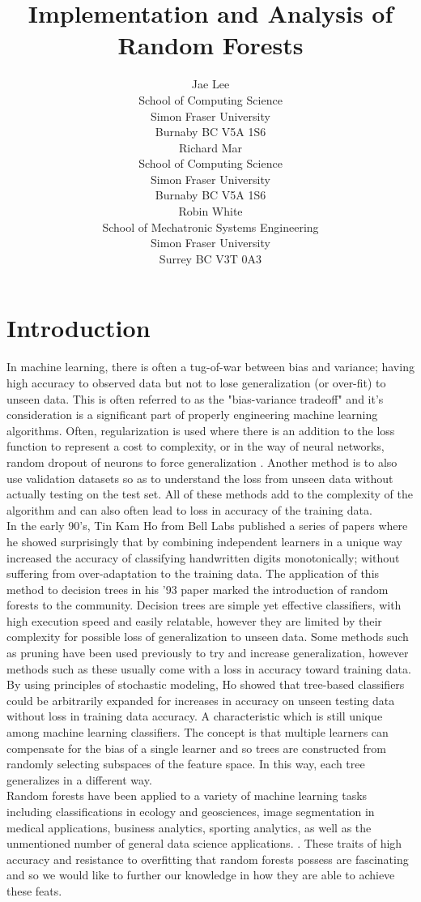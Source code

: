 \documentclass{article} %
\title{Implementation and Analysis of Random Forests}
\author{
Jae Lee\\
School of Computing Science\\
Simon Fraser University\\
Burnaby BC V5A 1S6 \\
\And
Richard Mar \\
School of Computing Science\\
Simon Fraser University\\
Burnaby BC V5A 1S6 \\
\AND
Robin White \\
School of Mechatronic Systems Engineering\\
Simon Fraser University\\
Surrey BC V3T 0A3 \\
}
\begin{document}
\maketitle

\section{Introduction}

In machine learning, there is often a tug-of-war between bias and variance; having high accuracy to observed data but not to lose generalization (or over-fit) to unseen data. This is often referred to as the "bias-variance tradeoff" and it's consideration is a significant part of properly engineering machine learning algorithms. Often, regularization is used where there is an addition to the loss function to represent a cost to complexity, or in the way of neural networks, random dropout of neurons to force generalization \cite{Srivastava2014}. Another method is to also use validation datasets so as to understand the loss from unseen data without actually testing on the test set. All of these methods add to the complexity of the algorithm and can also often lead to loss in accuracy of the training data.\\
In the early 90's, Tin Kam Ho from Bell Labs published a series of papers where he showed surprisingly that by combining independent learners in a unique way increased the accuracy of classifying handwritten digits monotonically; without suffering from over-adaptation to the training data. \cite{Ho93, Ho95, Ho98} The application of this method to decision trees in his '93 paper marked the introduction of random forests to the community. \cite{Ho93} Decision trees are simple yet effective classifiers, with high execution speed and easily relatable, however they are limited by their complexity for possible loss of generalization to unseen data. Some methods such as pruning have been used previously to try and increase generalization, however methods such as these usually come with a loss in accuracy toward training data. By using principles of stochastic modeling, Ho showed that tree-based classifiers could be arbitrarily expanded for increases in accuracy on unseen testing data without loss in training data accuracy. A characteristic which is still unique among machine learning classifiers. The concept is that multiple learners can compensate for the bias of a single learner and so trees are constructed from randomly selecting subspaces of the feature space. In this way, each tree generalizes in a different way. \\
Random forests have been applied to a variety of machine learning tasks including classifications in ecology and geosciences, image segmentation in medical applications, business analytics, sporting analytics, as well as the unmentioned number of general data science applications. \cite{Cutler2007, Harris2015, Luo2017, Ghatasheh2014, Lock2014}.  These traits of high accuracy and resistance to overfitting that random forests possess are fascinating and so we would like to further our knowledge in how they are able to achieve these feats.
\end{document}

